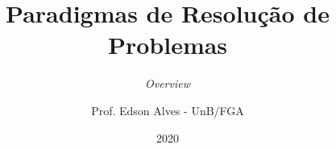 \title{Paradigmas de Resolução de Problemas}
\subtitle{\it Overview}
\author{Prof. Edson Alves - UnB/FGA}
\date{2020}
